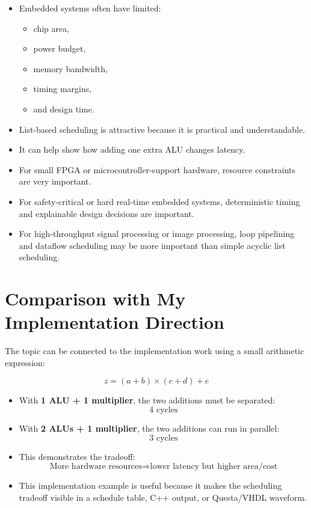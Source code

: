 \documentclass[11pt,a4paper]{article}
\begin{document}
\begin{itemize}[leftmargin=*]
    \item Embedded systems often have limited:
    \begin{itemize}
        \item chip area,
        \item power budget,
        \item memory bandwidth,
        \item timing margins,
        \item and design time.
    \end{itemize}
    \item List-based scheduling is attractive because it is practical and understandable.
    \item It can help show how adding one extra ALU changes latency.
    \item For small FPGA or microcontroller-support hardware, resource constraints are very important.
    \item For safety-critical or hard real-time embedded systems, deterministic timing and explainable design decisions are important.
    \item For high-throughput signal processing or image processing, loop pipelining and dataflow scheduling may be more important than simple acyclic list scheduling.
\end{itemize}

\section{Comparison with My Implementation Direction}

The topic can be connected to the implementation work using a small arithmetic expression:

\[
z = (a+b)\times(c+d)+e
\]

\begin{itemize}[leftmargin=*]
    \item With \textbf{1 ALU + 1 multiplier}, the two additions must be separated:
    \[
    4 \text{ cycles}
    \]
    \item With \textbf{2 ALUs + 1 multiplier}, the two additions can run in parallel:
    \[
    3 \text{ cycles}
    \]
    \item This demonstrates the tradeoff:
    \[
    \text{More hardware resources} \Rightarrow \text{lower latency but higher area/cost}
    \]
    \item This implementation example is useful because it makes the scheduling tradeoff visible in a schedule table, C++ output, or Questa/VHDL waveform.
\end{itemize}
\end{document}
